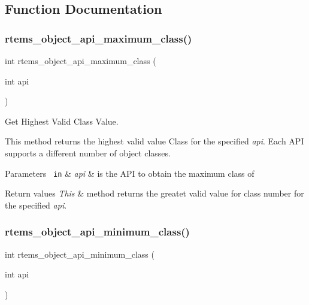 \subsection{Function Documentation}
\mbox{\label{group__ClassicClassInfo_ga83bbd111ed4c350325e0c3519b0c54a6}} 
\subsubsection{\texorpdfstring{rtems\_object\_api\_maximum\_class()}{rtems\_object\_api\_maximum\_class()}}
{\footnotesize\ttfamily int rtems\+\_\+object\+\_\+api\+\_\+maximum\+\_\+class (\begin{DoxyParamCaption}\item[{int}]{api }\end{DoxyParamCaption})}



Get Highest Valid Class Value. 

This method returns the highest valid value Class for the specified {\itshape api}. Each A\+PI supports a different number of object classes.


\begin{DoxyParams}[1]{Parameters}
\mbox{\texttt{ in}}  & {\em api} & is the A\+PI to obtain the maximum class of\\
\hline
\end{DoxyParams}

\begin{DoxyRetVals}{Return values}
{\em This} & method returns the greatet valid value for class number for the specified {\itshape api}. \\
\hline
\end{DoxyRetVals}
\mbox{\label{group__ClassicClassInfo_ga30005a0608899d37e7879f9867c0393f}} 
\subsubsection{\texorpdfstring{rtems\_object\_api\_minimum\_class()}{rtems\_object\_api\_minimum\_class()}}
{\footnotesize\ttfamily int rtems\+\_\+object\+\_\+api\+\_\+minimum\+\_\+class (\begin{DoxyParamCaption}\item[{int}]{api }\end{DoxyParamCaption})}




